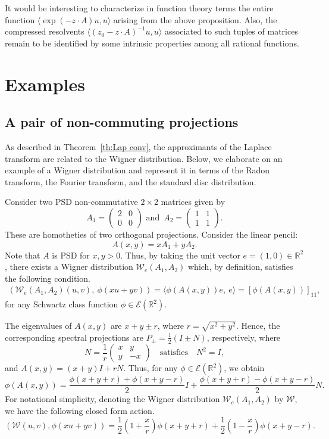 \documentclass[11pt,reqno]{amsart}
\theoremstyle{plain}
\theoremstyle{definition}
\numberwithin{equation}{section}
\newcommand{\beas}{\begin{eqnarray*}}
\newcommand{\eeas}{\end{eqnarray*}}
\begin{document}
It would be interesting to characterize in function theory terms the entire function $\langle \exp ( -z \cdot A)u, u \rangle $ arising from the above proposition. Also, the compressed resolvents
$\langle (z_0 - z \cdot A)^{-1} u, u \rangle$ associated to such tuples of matrices remain to be identified by some intrinsic properties among all rational functions. 
 
	
\section{Examples} \label{Sec:Exp}
 
\subsection{A pair of non-commuting projections} \label{Sub:pair-nc-projections}

As described in Theorem~\ref{th:Lap conv}, the approximants of the Laplace transform are related to the Wigner distribution. Below, we elaborate on an example of a Wigner distribution and represent it in terms of the Radon transform, the Fourier transform, and the standard disc distribution.

Consider two PSD non-commutative $2\times 2$ matrices given by
\[
A_1=\begin{pmatrix}2&0\\0&0\end{pmatrix} \,\,\text{and }\, A_2=\begin{pmatrix}1&1\\1&1\end{pmatrix}.
\]
These are homotheties of two orthogonal projections. Consider the linear pencil:
$$
A(x,y)=xA_1+yA_2.
$$
Note that $A$ is PSD for $x,y >0$. Thus, by taking the unit vector $e=(1, 0) \in\mathbb{R}^2$, there exists a Wigner distribution $\mathcal{W}_e(A_1, A_2)$ which, by definition, satisfies the following condition.
\beas 
( \mathcal{W}_e(A_1, A_2)(u, v), \ \phi(xu+yv) ) = \langle \phi(A(x,y)) e, \ e \rangle = [\phi(A(x,y))]_{11},
\eeas
for any Schwartz class function $\phi \in \mathcal E({\mathbb R}^2)$. 

The eigenvalues of $A(x,y)$ are $ x+y \pm r$, where $r=\sqrt{x^2+y^2}.$ Hence, the corresponding spectral projections are $P_\pm=\frac{1}{2}(I\pm N)$, respectively, where $$
N=\frac1r\begin{pmatrix}x&y\\y&-x\end{pmatrix}
\quad\text{satisfies}\quad
N^2=I,
$$
and $A(x,y)=(x+y)I+r N$. Thus, for any $\phi \in \mathcal E(\mathbb{R}^2)$, we obtain
$$
\phi(A(x,y))
=
\frac{\phi(x+y+r)+\phi(x+y-r)}{2}I
+
\frac{\phi(x+y+r)-\phi(x+y-r)}{2}N.
$$
For notational simplicity, denoting the Wigner distribution $\mathcal{W}_e(A_1, A_2)$ by $\mathcal{W}$, we have the following closed form action.
$$ ( \mathcal{W}(u,v) , \phi(xu+yv) )
=
\frac12\left(1+\frac{x}{r}\right)\phi(x+y+r)
+
\frac12\left(1-\frac{x}{r}\right)\phi(x+y-r).
$$
\end{document}
